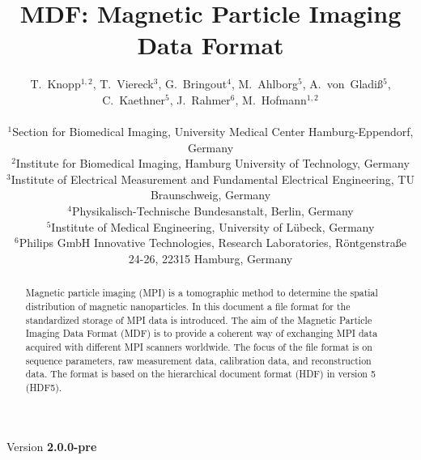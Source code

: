 \documentclass[landscape]{article} %
\begin{document}
\title{MDF: Magnetic Particle Imaging Data Format}
\newcommand{\version}{2.0.0-pre}

\author{
T.~Knopp$^{1,2}$, T.~Viereck$^3$, G.~Bringout$^4$, M.~Ahlborg$^5$, A.~von~Gladi\ss$^5$, C.~Kaethner$^5$, J.~Rahmer$^6$, M.~Hofmann$^{1,2}$ \\ \\
$^1$Section for Biomedical Imaging, University Medical Center Hamburg-Eppendorf, Germany\\
$^2$Institute for Biomedical Imaging, Hamburg University of Technology, Germany\\
$^3$Institute of Electrical Measurement and Fundamental Electrical Engineering, TU Braunschweig, Germany\\
$^4$Physikalisch-Technische Bundesanstalt, Berlin, Germany\\
$^5$Institute of Medical Engineering, University of  Lübeck, Germany\\
$^6$Philips GmbH Innovative Technologies, Research Laboratories, Röntgenstraße 24-26, 22315 Hamburg, Germany
}

\maketitle
\begin{center}
Version \textbf{\version}
\end{center}

\begin{abstract}
Magnetic particle imaging (MPI) is a tomographic method to determine the spatial distribution of magnetic nanoparticles. In this document a file format for the standardized storage of MPI data is introduced. The aim of the Magnetic Particle Imaging Data Format (MDF) is to provide a coherent way of exchanging MPI data acquired with different MPI scanners worldwide. The focus of the file format is on sequence parameters, raw measurement data, calibration data, and reconstruction data. The format is based on the hierarchical document format (HDF) in version 5 (HDF5).
\end{abstract}
\end{document}
